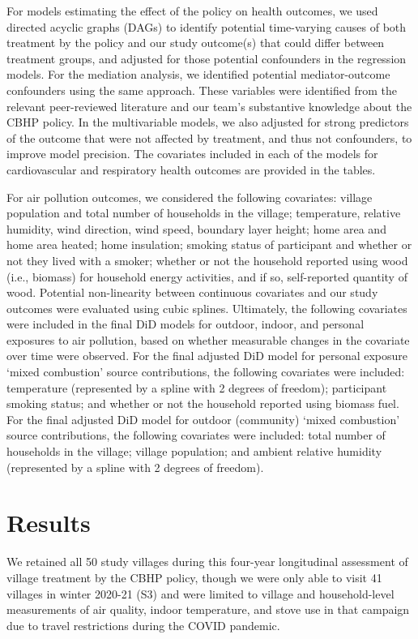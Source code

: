 \documentclass[
  letterpaper,
  DIV=11,
  numbers=noendperiod]{scrartcl}
\begin{document}
For models estimating the effect of the policy on health outcomes, we
used directed acyclic graphs (DAGs) to identify potential time-varying
causes of both treatment by the policy and our study outcome(s) that
could differ between treatment groups, and adjusted for those potential
confounders in the regression models. For the mediation analysis, we
identified potential mediator-outcome confounders using the same
approach. These variables were identified from the relevant
peer-reviewed literature and our team's substantive knowledge about the
CBHP policy. In the multivariable models, we also adjusted for strong
predictors of the outcome that were not affected by treatment, and thus
not confounders, to improve model precision. The covariates included in
each of the models for cardiovascular and respiratory health outcomes
are provided in the tables.

For air pollution outcomes, we considered the following covariates:
village population and total number of households in the village;
temperature, relative humidity, wind direction, wind speed, boundary
layer height; home area and home area heated; home insulation; smoking
status of participant and whether or not they lived with a smoker;
whether or not the household reported using wood (i.e., biomass) for
household energy activities, and if so, self-reported quantity of wood.
Potential non-linearity between continuous covariates and our study
outcomes were evaluated using cubic splines. Ultimately, the following
covariates were included in the final DiD models for outdoor, indoor,
and personal exposures to air pollution, based on whether measurable
changes in the covariate over time were observed. For the final adjusted
DiD model for personal exposure `mixed combustion' source contributions,
the following covariates were included: temperature (represented by a
spline with 2 degrees of freedom); participant smoking status; and
whether or not the household reported using biomass fuel. For the final
adjusted DiD model for outdoor (community) `mixed combustion' source
contributions, the following covariates were included: total number of
households in the village; village population; and ambient relative
humidity (represented by a spline with 2 degrees of freedom).

\hypertarget{results-1}{%
\section{Results}\label{results-1}}

We retained all 50 study villages during this four-year longitudinal
assessment of village treatment by the CBHP policy, though we were only
able to visit 41 villages in winter 2020-21 (S3) and were limited to
village and household-level measurements of air quality, indoor
temperature, and stove use in that campaign due to travel restrictions
during the COVID pandemic.
\end{document}
